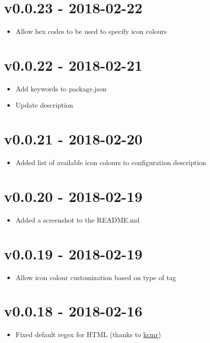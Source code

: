 \chapter{v0.0.23 - 2018-02-22}
\begin{itemize}
\item{Allow hex codes to be used to specify icon colours}
\end{itemize}

\chapter{v0.0.22 - 2018-02-21}
\begin{itemize}
\item{Add keywords to package.json}
\item{Update description}
\end{itemize}

\chapter{v0.0.21 - 2018-02-20}
\begin{itemize}
\item{Added list of available icon colours to configuration description}
\end{itemize}

\chapter{v0.0.20 - 2018-02-19}
\begin{itemize}
\item{Added a screenshot to the README.md}
\end{itemize}

\chapter{v0.0.19 - 2018-02-19}
\begin{itemize}
\item{Allow icon colour customization based on type of tag}
\end{itemize}

\chapter{v0.0.18 - 2018-02-16}
\begin{itemize}
\item{Fixed default regex for HTML (thanks to \href{https://github.com/kcmr}{kcmr})}
\end{itemize}

